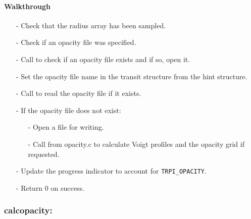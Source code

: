 \documentclass[letterpaper,12pt]{article}
\begin{document}
\paragraph{Walkthrough}
\begin{enumerate}[leftmargin=10pt, noitemsep, parsep=0pt, topsep=0ex]
\item[-] Check that the radius array has been sampled.
\item[-] Check if an opacity file was specified.
\item[-] Call  to check if an opacity file exists and if so, open it.
\item[-] Set the opacity file name in the transit structure from the hint structure.
\item[-] Call  to read the opacity file if it exists.
\item[-] If the opacity file does not exist:
\begin{enumerate}[leftmargin=10pt, noitemsep, parsep=0pt, topsep=0ex]
\item[-] Open a file for writing.
\item[-] Call  from opacity.c to calculate Voigt profiles and the opacity grid if requested.
\end{enumerate}
\item[-] Update the progress indicator to account for {\tt TRPI\_OPACITY}.
\item[-] Return 0 on success.
\end{enumerate}

\subsubsection{calcopacity:}
\end{document}
